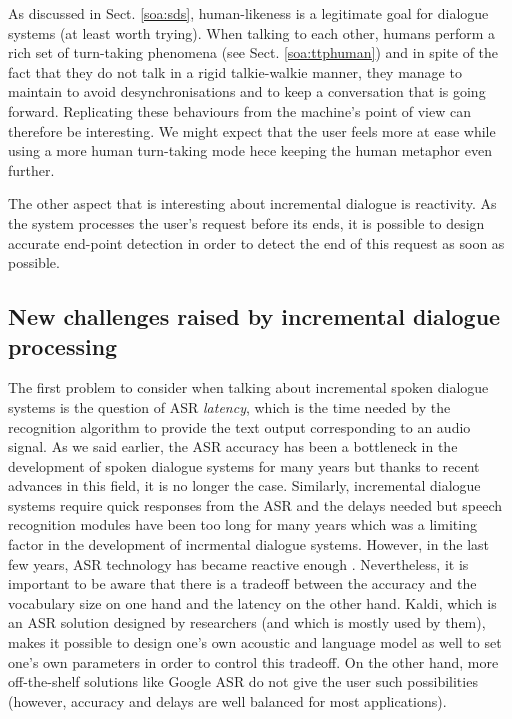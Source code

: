                As discussed in Sect. \ref{soa:sds}, human-likeness is a legitimate goal for dialogue systems (at least worth trying). When talking to each other, humans perform a rich set of turn-taking phenomena (see Sect. \ref{soa:ttphuman}) and in spite of the fact that they do not talk in a rigid talkie-walkie manner, they manage to maintain to avoid desynchronisations and to keep a conversation that is going forward. Replicating these behaviours from the machine's point of view can therefore be interesting. We might expect that the user feels more at ease while using a more human turn-taking mode hece keeping the human metaphor even further.

                The other aspect that is interesting about incremental dialogue is reactivity. As the system processes the user's request before its ends, it is possible to design accurate end-point detection in order to detect the end of this request as soon as possible.


	\subsection{New challenges raised by incremental dialogue processing}
    
		The first problem to consider when talking about incremental spoken dialogue systems is the question of ASR \textit{latency}, which is the time needed by the recognition algorithm to provide the text output corresponding to an audio signal. As we said earlier, the ASR accuracy has been a bottleneck in the development of spoken dialogue systems for many years but thanks to recent advances in this field, it is no longer the case. Similarly, incremental dialogue systems require quick responses from the ASR and the delays needed but speech recognition modules have been too long for many years which was a limiting factor in the development of incrmental dialogue systems. However, in the last few years, ASR technology has became reactive enough \cite{Platek2014}. Nevertheless, it is important to be aware that there is a tradeoff between the accuracy and the vocabulary size on one hand and the latency on the other hand. Kaldi, which is an ASR solution designed by researchers (and which is mostly used by them), makes it possible to design one's own acoustic and language model as well to set one's own parameters in order to control this tradeoff. On the other hand, more off-the-shelf solutions like Google ASR do not give the user such possibilities (however, accuracy and delays are well balanced for most applications).

